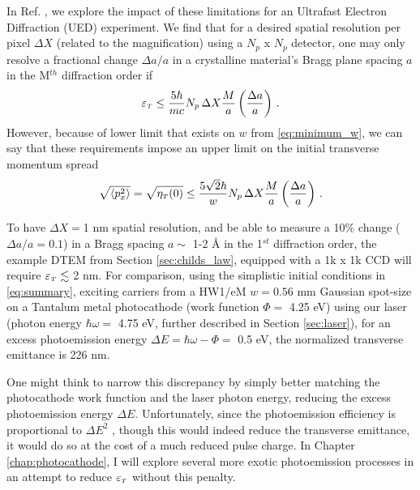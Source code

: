 In Ref. \cite{berger_dc_2009}, we explore the impact of these limitations for an Ultrafast Electron Diffraction (UED) experiment.
We find that for a desired spatial resolution per pixel $\Delta X$ (related to the magnification) using a $N_p$ x $N_p$ detector, one may only resolve a fractional change $\Delta a / a$ in a crystalline material's Bragg plane spacing $a$ in the M$^{th}$ diffraction order if
\begin{equation}
  \varepsilon_{{\scriptscriptstyle T}} \le \frac{5 \hbar}{m c} N_p \, \Delta X \frac{M}{a} \left ( \frac{\Delta a}{a} \right ) \,\text{.}
\end{equation}
However, because of lower limit that exists on $w$ from \ref{eq:minimum_w}, we can say that these requirements impose an upper limit on the initial transverse momentum spread
\begin{equation}
  \sqrt{ \left < p_x^2 \right > } = \sqrt{ \eta_{{\scriptscriptstyle T}} (0) } \le \frac{5\sqrt{2} \hbar}{w} N_p \, \Delta X \frac{M}{a} \left ( \frac{\Delta a}{a} \right ) \,\text{.}
\end{equation}

To have $\Delta X = $1 nm spatial resolution, and be able to measure a 10\% change ($\Delta a / a = 0.1$) in a Bragg spacing $a \sim$ 1-2 \AA{} in the 1$^{st}$ diffraction order, the example DTEM from Section \ref{sec:childs_law}, equipped with a 1k x 1k CCD will require $\varepsilon_{{\scriptscriptstyle T}} \lesssim$ 2 nm.
For comparison, using the simplistic initial conditions in \ref{eq:summary}, exciting carriers from a HW1/eM $w = 0.56 \text{ mm}$ Gaussian spot-size on a Tantalum metal photocathode (work function $\Phi =$ 4.25 eV) using our laser (photon energy $\hbar \omega =$ 4.75 eV, further described in Section \ref{sec:laser}), for an excess photoemission energy $\Delta E = \hbar \omega - \Phi =$ 0.5 eV, the normalized transverse emittance is 226 nm.

One might think to narrow this discrepancy by simply better matching the photocathode work function and the laser photon energy, reducing the excess photoemission energy $\Delta E$.
Unfortunately, since the photoemission efficiency is proportional to $\Delta E^2$ \cite{shalaev_electron_1994}, though this would indeed reduce the transverse emittance, it would do so at the cost of a much reduced pulse charge.
In Chapter \ref{chap:photocathode}, I will explore several more exotic photoemission processes in an attempt to reduce $\varepsilon_{{\scriptscriptstyle T}}$ without this penalty.
